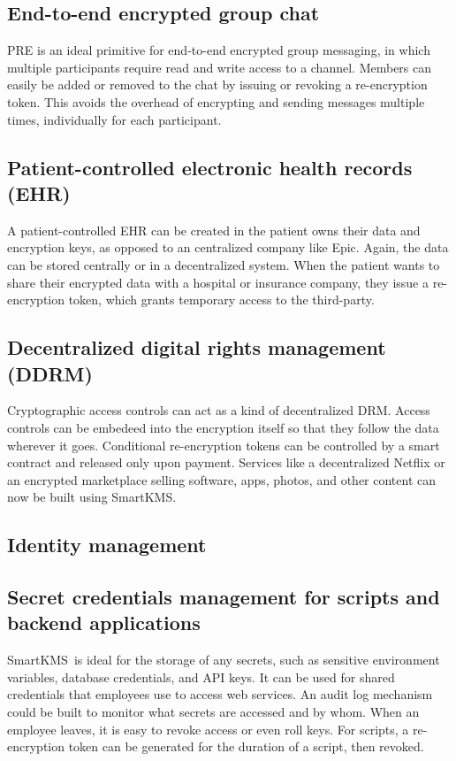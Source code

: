 \documentclass[notitlepage,longbibliography]{revtex4-1}
\newcommand{\kms}{SmartKMS}
\begin{document}
\subsection{End-to-end encrypted group chat}
PRE is an ideal primitive for end-to-end encrypted group messaging, in which multiple participants require read and write
access to a channel. Members can easily be added or removed to the chat by issuing or revoking a re-encryption token.
This avoids the overhead of encrypting and sending messages multiple times, individually for each participant.

\subsection{Patient-controlled electronic health records (EHR)}
A patient-controlled EHR can be created in the patient owns their data and encryption keys, as opposed to an centralized
company like Epic.
Again, the data can be stored centrally or in a decentralized system.
When the patient wants to share their encrypted data with a hospital or insurance company, they issue a re-encryption token,
which grants temporary access to the third-party.

\subsection{Decentralized digital rights management (DDRM)}
Cryptographic access controls can act as a kind of decentralized DRM.
Access controls can be embedeed into the encryption itself so that they follow the data wherever it goes.
Conditional re-encryption tokens can be controlled by a smart contract and released only upon payment.
Services like a decentralized Netflix or an encrypted marketplace selling software, apps, photos, and other content
can now be built using \kms.

\subsection{Identity management}

\subsection{Secret credentials management for scripts and backend applications}
\kms~is ideal for the storage of any secrets, such as sensitive environment variables, database credentials, and API keys.
It can be used for shared credentials that employees use to access web services.
An audit log mechanism could be built to monitor what secrets are accessed and by whom.
When an employee leaves, it is easy to revoke access or even roll keys.
For scripts, a re-encryption token can be generated for the duration of a script, then revoked.
\end{document}
